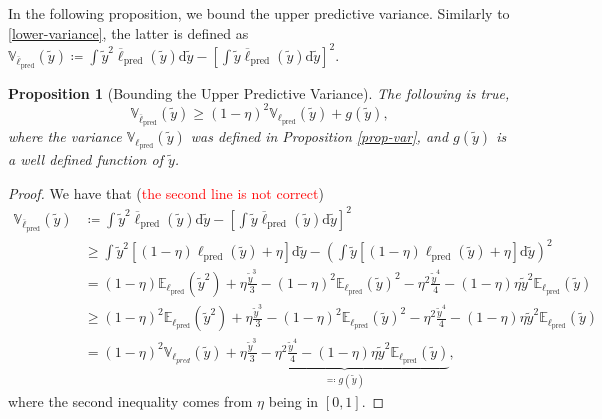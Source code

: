 \documentclass[12pt, english, oneside, a4paper]{article}
\newtheorem{proposition}[theorem]{Proposition}
\begin{document}
In the following proposition, we bound the upper predictive variance. Similarly to \eqref{lower-variance}, the latter is defined as $\mathbb{V}_{\overline{\ell}_\text{pred}}(\tilde{y}) \coloneqq \int \tilde{y}^2 \overline{\ell}_\text{pred}(\tilde{y}) \text{d}\tilde{y} - \left[\int \tilde{y} \overline{\ell}_\text{pred}(\tilde{y}) \text{d}\tilde{y}\right]^2$. 

\begin{proposition}[Bounding the Upper Predictive Variance]\label{cor-2}
    The following is true,
    $$\mathbb{V}_{\overline{\ell}_\text{pred}}(\tilde{y}) \geq (1-\eta)^2 \mathbb{V}_{{\ell}_\text{pred}}(\tilde{y}) + g(\tilde{y}),$$
    where the variance $\mathbb{V}_{{\ell}_\text{pred}}(\tilde{y})$ was defined in Proposition \ref{prop-var}, and $g(\tilde{y})$ is a well defined function of $\tilde{y}$.
\end{proposition}

\begin{proof}
We have that (\textcolor{red}{the second line is not correct})
    \begin{align*}
        \mathbb{V}_{\overline{\ell}_\text{pred}}(\tilde{y}) &\coloneqq \int \tilde{y}^2 \overline{\ell}_\text{pred}(\tilde{y}) \text{d}\tilde{y} - \left[\int \tilde{y} \overline{\ell}_\text{pred}(\tilde{y}) \text{d}\tilde{y}\right]^2\\
        &\geq \int \tilde{y}^2 \left[ (1-\eta) {\ell}_\text{pred}(\tilde{y}) +\eta \right] \text{d}\tilde{y} - \left(\int \tilde{y} \left[(1-\eta) {\ell}_\text{pred}(\tilde{y}) + \eta \right] \text{d}\tilde{y}\right)^2 \\
        &= (1-\eta) \mathbb{E}_{\ell_\text{pred}}(\tilde{y}^2) + \eta \frac{\tilde y ^3}{3} - (1-\eta)^2 \mathbb{E}_{\ell_\text{pred}}(\tilde{y})^2 -\eta^2 \frac{\tilde y ^4}{4} - (1-\eta) \eta \tilde{y}^2 \mathbb{E}_{\ell_\text{pred}}(\tilde{y})\\
        &\geq (1-\eta)^2 \mathbb{E}_{\ell_\text{pred}}(\tilde{y}^2) + \eta \frac{\tilde y ^3}{3} - (1-\eta)^2 \mathbb{E}_{\ell_\text{pred}}(\tilde{y})^2 -\eta^2 \frac{\tilde y ^4}{4} - (1-\eta) \eta \tilde{y}^2 \mathbb{E}_{\ell_\text{pred}}(\tilde{y})\\
        &= (1-\eta)^2\mathbb{V}_{\ell_{pred}}(\tilde{y})+ \underbrace{\eta \frac{\tilde y ^3}{3} -\eta^2 \frac{\tilde y ^4}{4} - (1-\eta) \eta \tilde{y}^2 \mathbb{E}_{\ell_\text{pred}}(\tilde{y})}_{\eqqcolon g(\tilde{y})},
    \end{align*}
where 
the second inequality comes from $\eta$ being in $[0,1]$.
\end{proof}
\end{document}
